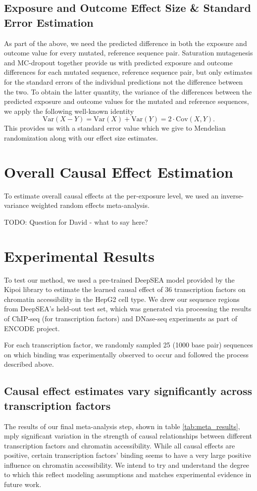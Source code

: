 \documentclass{article}
\begin{document}
\subsection{Exposure and Outcome Effect Size \& Standard Error Estimation}
As part of the above, we need the predicted difference in both the exposure and outcome value for every mutated, reference sequence pair. Saturation mutagenesis and MC-dropout together provide us with predicted exposure and outcome differences for each mutated sequence, reference sequence pair, but only estimates for the standard errors of the individual predictions not the difference between the two. To obtain the latter quantity, the variance of the differences between the predicted exposure and outcome values for the mutated and reference sequences, we apply the following well-known identity
\begin{equation}
    \text{Var}(X - Y) = \text{Var}(X) + \text{Var}(Y) = 2 \cdot \text{Cov}(X, Y).
\end{equation}
This provides us with a standard error value which we give to Mendelian randomization along with our effect size estimates.

\section{Overall Causal Effect Estimation}
To estimate overall causal effects at the per-exposure level, we used an inverse-variance weighted random effects meta-analysis.

TODO: Question for David - what to say here?

\section{Experimental Results}
To test our method, we used a pre-trained DeepSEA model provided by the Kipoi library  to estimate the learned causal effect of 36 transcription factors on chromatin accessibility in the HepG2 cell type. We drew our sequence regions from DeepSEA's held-out test set, which was generated via processing the results of ChIP-seq (for transcription factors) and DNase-seq experiments as part of ENCODE project.

For each transcription factor, we randomly sampled 25 (1000 base pair) sequences on which binding was experimentally observed to occur and followed the process described above. 

\subsection*{Causal effect estimates vary significantly across transcription factors}
The results of our final meta-analysis step, shown in table \ref{tab:meta_results}, mply significant variation in the strength of causal relationships between different transcription factors and chromatin accessibility. While all causal effects are positive, certain transcription factors' binding seems to have a very large positive influence on chromatin accessibility. We intend to try and understand the degree to which this reflect modeling assumptions and matches experimental evidence in future work.
\end{document}
